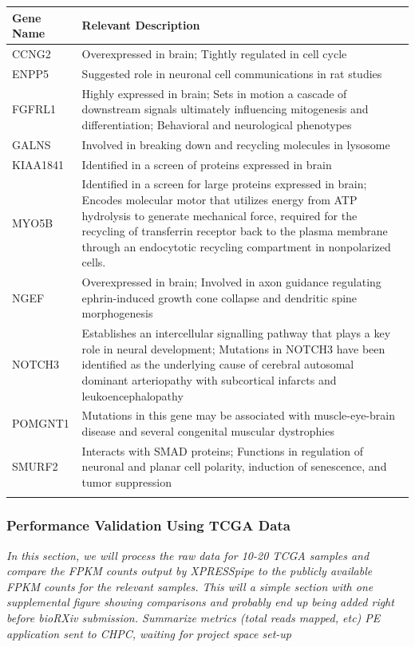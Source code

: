 \documentclass[11pt, a4paper, oneside]{article}
\begin{document}
\begin{tabular}{p{2.5cm}p{15.5cm}}
 \textbf{Gene Name} & \textbf{Relevant Description} \\
 \hline
 CCNG2 & Overexpressed in brain; Tightly regulated in cell cycle \\
 \hline
 ENPP5 & Suggested role in neuronal cell communications in rat studies \\
 \hline
 FGFRL1 & Highly expressed in brain; Sets in motion a cascade of downstream signals ultimately influencing mitogenesis and differentiation; Behavioral and neurological phenotypes \\
 \hline
 GALNS & Involved in breaking down and recycling molecules in lysosome \\
 \hline
 KIAA1841 & Identified in a screen of proteins expressed in brain \\
 \hline
 MYO5B & Identified in a screen for large proteins expressed in brain; Encodes molecular motor that utilizes energy from ATP hydrolysis to generate mechanical force, required for the recycling of transferrin receptor back to the plasma membrane through an endocytotic recycling compartment in nonpolarized cells. \\
 \hline
 NGEF & Overexpressed in brain; Involved in axon guidance regulating ephrin-induced growth cone collapse and dendritic spine morphogenesis \\
 \hline
 NOTCH3 & Establishes an intercellular signalling pathway that plays a key role in neural development; Mutations in NOTCH3 have been identified as the underlying cause of cerebral autosomal dominant arteriopathy with subcortical infarcts and leukoencephalopathy \\
 \hline
 POMGNT1 & Mutations in this gene may be associated with muscle-eye-brain disease and several congenital muscular dystrophies \\
 \hline
 SMURF2 & Interacts with SMAD proteins; Functions in regulation of neuronal and planar cell polarity, induction of senescence, and tumor suppression \\
 \label{tab:targets}
\end{tabular}
\newline

\subsubsection{Performance Validation Using TCGA Data}
\textit{In this section, we will process the raw data for 10-20 TCGA samples and compare the FPKM counts output by XPRESSpipe to the publicly available FPKM counts for the relevant samples.
This will a simple section with one supplemental figure showing comparisons and probably end up being added right before bioRXiv submission.
Summarize metrics (total reads mapped, etc)
PE application sent to CHPC, waiting for project space set-up}
\end{document}
